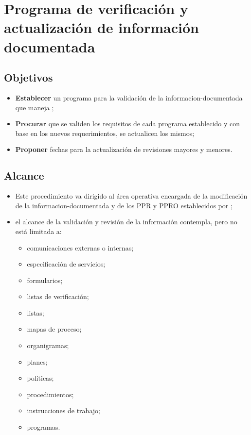 \renewcommand{\MayorVer}{1}
\renewcommand{\MenorVer}{0}
\renewcommand{\Codigo}{G-1-PRO}
\renewcommand{\FechaPub}{2023--01}
\renewcommand{\Titulo}{Programa de verificación y actualización de información documentada}

\section{\Titulo}
\label{informacion.actualizacion}

\subsection{Objetivos}
\begin{itemize}
    \item \textbf{Establecer} un programa para la validación de la \gls{informacion-documentada} que maneja ;
    \item \textbf{Procurar} que se validen los requisitos de cada programa establecido y con base en los nuevos requerimientos, se actualicen los mismos;
    \item \textbf{Proponer} fechas para la actualización de revisiones mayores y menores.
\end{itemize}

\subsection{Alcance}
\begin{itemize}
    \item Este procedimiento va dirigido al área operativa encargada de la modificación de la \gls{informacion-documentada} y de los \gls{PPR} y \gls{PPRO} establecidos por ;
    \item el alcance de la validación y revisión de la información contempla, pero no está limitada a:
          \begin{itemize}
              \item comunicaciones externas o internas;
              \item especificación de servicios;
              \item formularios;
              \item listas de verificación;
              \item listas;
              \item mapas de proceso;
              \item organigramas;
              \item planes;
              \item políticas;
              \item procedimientos;
              \item instrucciones de trabajo;
              \item programas.
          \end{itemize}
\end{itemize}

